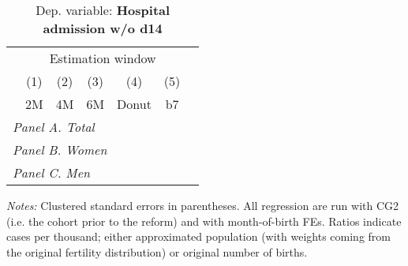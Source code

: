  \begin{table}[htbp] \centering \begin{threeparttable} \centering \caption{Dep. variable: \textbf{Hospital admission w/o d14}} {\def\sym#1{\ifmmode^{#1}\else\(^{#1}\)\fi} \begin{tabular}{l*{6}{c}} \toprule & \multicolumn{5}{c}{Estimation window} \\ \cmidrule(lr){2-5}
            &\multicolumn{1}{c}{(1)}&\multicolumn{1}{c}{(2)}&\multicolumn{1}{c}{(3)}&\multicolumn{1}{c}{(4)}&\multicolumn{1}{c}{(5)}\\
            &\multicolumn{1}{c}{2M}&\multicolumn{1}{c}{4M}&\multicolumn{1}{c}{6M}&\multicolumn{1}{c}{Donut}&\multicolumn{1}{c}{b7}\\
\midrule
 \multicolumn{6}{l}{\emph{Panel A. Total}} \\      \midrule\multicolumn{6}{l}{\emph{Panel B. Women}} \\      \midrule\multicolumn{6}{l}{\emph{Panel C. Men}} \\      
\bottomrule \end{tabular} } \begin{tablenotes} \item \scriptsize \emph{Notes:} Clustered standard errors in parentheses. All regression are run with CG2 (i.e. the cohort prior to the reform) and with month-of-birth FEs. Ratios indicate cases per thousand; either approximated population (with weights coming from the original fertility distribution) or original number of births. \end{tablenotes} \end{threeparttable} \end{table} 
